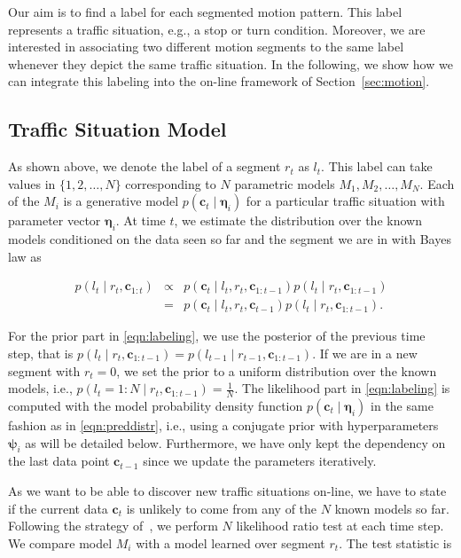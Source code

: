 Our aim is to find a label for each segmented motion pattern. This label
represents a traffic situation, e.g., a stop or turn condition. Moreover, we are
interested in associating two different motion segments to the same label
whenever they depict the same traffic situation. In the following, we show how
we can integrate this labeling into the on-line framework of
Section~\ref{sec:motion}.

\subsection{Traffic Situation Model}
As shown above, we denote the label of a segment $r_t$ as $l_t$. This label can
take values in $\{1,2,\dots,N\}$ corresponding to $N$ parametric models $M_1,M_2,
\dots,M_N$. Each of the $M_i$ is a generative model $p(\mathbf{c}_t\mid
\boldsymbol{\eta}_i)$ for a particular traffic situation with parameter vector
$\boldsymbol{\eta}_i$. At time $t$, we estimate the distribution over the known
models conditioned on the data seen so far and the segment we are in with Bayes
law as

\begin{eqnarray}
\label{eqn:labeling}
p(l_t\mid r_t,\mathbf{c}_{1:t})&\propto&p(\mathbf{c}_t\mid l_t,r_t,
\mathbf{c}_{1:t-1})p(l_t\mid r_t,\mathbf{c}_{1:t-1})\nonumber\\
&=& p(\mathbf{c}_t\mid l_t,r_t,\mathbf{c}_{t-1})p(l_t\mid
r_t,\mathbf{c}_{1:t-1}).
\end{eqnarray}

For the prior part in \eqref{eqn:labeling}, we use the posterior of the previous
time step, that is
$p(l_t\mid r_t,\mathbf{c}_{1:t-1})=p(l_{t-1}\mid r_{t-1},\mathbf{c}_{1:t-1})$.
If we are in a new segment with $r_t=0$, we set the prior to a uniform
distribution over the known models, i.e., $p(l_t=1:N\mid r_t,\mathbf{c}_{1:t-1})=
\frac{1}{N}$. The likelihood part in
\eqref{eqn:labeling} is computed with the model probability density function
$p(\mathbf{c}_t\mid \boldsymbol{\eta}_i)$ in the same fashion as in
\eqref{eqn:preddistr}, i.e., using a conjugate prior with hyperparameters
$\boldsymbol{\psi}_i$ as will be detailed below. Furthermore, we have only kept
the dependency on the last data point $\mathbf{c}_{t-1}$ since we update the
parameters iteratively.

As we want to be able to discover new traffic situations on-line, we have to
state if the current data $\mathbf{c}_t$ is unlikely to come from any of the
$N$ known models so far. Following the strategy of~\cite{ranganathan10pliss},
we perform $N$ likelihood ratio test at each time step. We compare model $M_i$
with a model learned over segment $r_t$. The test statistic is

